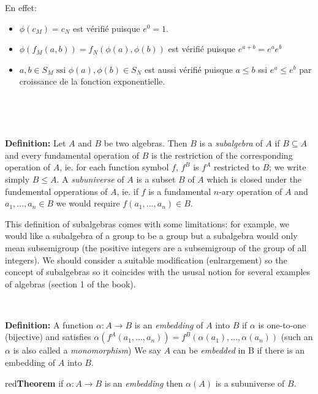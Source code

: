 \documentclass[a4paper, 11pt]{article}
\begin{document}
En effet:

\begin{itemize}
    \item $\phi(c_M) = c_N$ est vérifié puisque $e^0 = 1$.
    \item $\phi(f_M(a,b)) = f_N(\phi(a),\phi(b))$ est vérifié puisque $e^{a + b} = e^ae^b$
    \item $a,b \in S_M \text{ ssi } \phi(a),\phi(b) \in S_N$ est aussi vérifié puisque $a \leq b$ ssi $e^a \leq e^b$ par croissance de la fonction exponentielle.
\end{itemize}

\

\

\begin{tcolorbox} 
	\textbf{Definition:} Let $A$ and $B$ be two algebras. Then $B$ is a \textit{subalgebra} of $A$ if $B \subseteq A$ and every fundamental operation of $B$ is the restriction of the corresponding operation of $A$, ie. for each function symbol $f$, $f^B$ is $f^A$ restricted to $B$; we write simply $B \leq A$. A \textit{subuniverse} of $A$ is a subset $B$ of $A$ which is closed under the fundemental opperations of $A$, ie. if $f$ is a fundamental $n$-ary operation of $A$ and $a_1, ..., a_n \in B$ we would require $f(a_1, ..., a_n) \in B$.
\end{tcolorbox}

This definition of subalgebras comes with some limitations: for example, we would like a subalgebra of a group to be a group but a subalgebra would only mean subsemigroup (the positive integers are a subsemigroup of the group of all integers). We should consider a suitable modification (enlrargement) so the concept of subalgebras so it coincides with the ususal notion for several examples of algebras (section 1 of the book).

\

\begin{tcolorbox} 
	\textbf{Definition:} A function $\alpha: A \rightarrow B$ is an \textit{embedding} of $A$ into $B$ if $\alpha$ is one-to-one (bijective) and satisfies $\alpha (f^A(a_1, ..., a_n)) = f^B(\alpha (a_1), ..., \alpha (a_n))$ (such an $\alpha$ is also called a \textit{monomorphism}) We say $A$ can be \textit{embedded} in B if there is an embedding of $A$ into $B$.
\end{tcolorbox}

\begin{mybox}{red}{\textbf{Theorem}}
	if $\alpha : A \rightarrow B$ is an \textit{embedding} then $\alpha(A)$ is a subuniverse of $B$.
\end{mybox}
\end{document}
